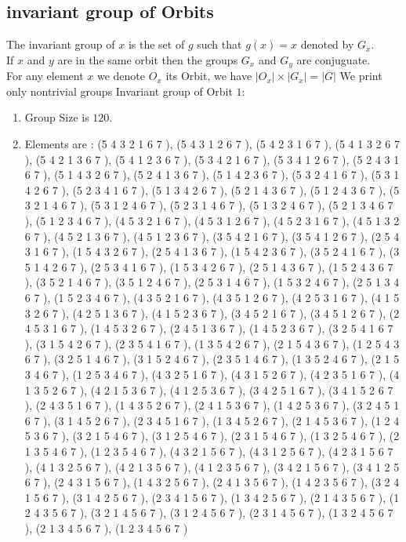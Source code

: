 \documentclass[12pt]{article}
\begin{document}
\subsection{invariant group of Orbits}
\noindent The invariant group of $x$ is the set of $g$ such that $g(x)=x$ denoted by $G_x$.\\
If $x$ and $y$ are in the same orbit then the groups $G_x$ and  $G_y$ are conjuguate.\\
For any element $x$ we denote $O_x$ its Orbit, we have $|O_x|\times |G_x|=|G|$
We print only nontrivial groups
Invariant group of Orbit $1$:
\begin{enumerate}
\item Group Size is $120$.
\item Elements are : (5 4 3 2 1 6 7  ), (5 4 3 1 2 6 7  ), (5 4 2 3 1 6 7  ), (5 4 1 3 2 6 7  ), (5 4 2 1 3 6 7  ), (5 4 1 2 3 6 7  ), (5 3 4 2 1 6 7  ), (5 3 4 1 2 6 7  ), (5 2 4 3 1 6 7  ), (5 1 4 3 2 6 7  ), (5 2 4 1 3 6 7  ), (5 1 4 2 3 6 7  ), (5 3 2 4 1 6 7  ), (5 3 1 4 2 6 7  ), (5 2 3 4 1 6 7  ), (5 1 3 4 2 6 7  ), (5 2 1 4 3 6 7  ), (5 1 2 4 3 6 7  ), (5 3 2 1 4 6 7  ), (5 3 1 2 4 6 7  ), (5 2 3 1 4 6 7  ), (5 1 3 2 4 6 7  ), (5 2 1 3 4 6 7  ), (5 1 2 3 4 6 7  ), (4 5 3 2 1 6 7  ), (4 5 3 1 2 6 7  ), (4 5 2 3 1 6 7  ), (4 5 1 3 2 6 7  ), (4 5 2 1 3 6 7  ), (4 5 1 2 3 6 7  ), (3 5 4 2 1 6 7  ), (3 5 4 1 2 6 7  ), (2 5 4 3 1 6 7  ), (1 5 4 3 2 6 7  ), (2 5 4 1 3 6 7  ), (1 5 4 2 3 6 7  ), (3 5 2 4 1 6 7  ), (3 5 1 4 2 6 7  ), (2 5 3 4 1 6 7  ), (1 5 3 4 2 6 7  ), (2 5 1 4 3 6 7  ), (1 5 2 4 3 6 7  ), (3 5 2 1 4 6 7  ), (3 5 1 2 4 6 7  ), (2 5 3 1 4 6 7  ), (1 5 3 2 4 6 7  ), (2 5 1 3 4 6 7  ), (1 5 2 3 4 6 7  ), (4 3 5 2 1 6 7  ), (4 3 5 1 2 6 7  ), (4 2 5 3 1 6 7  ), (4 1 5 3 2 6 7  ), (4 2 5 1 3 6 7  ), (4 1 5 2 3 6 7  ), (3 4 5 2 1 6 7  ), (3 4 5 1 2 6 7  ), (2 4 5 3 1 6 7  ), (1 4 5 3 2 6 7  ), (2 4 5 1 3 6 7  ), (1 4 5 2 3 6 7  ), (3 2 5 4 1 6 7  ), (3 1 5 4 2 6 7  ), (2 3 5 4 1 6 7  ), (1 3 5 4 2 6 7  ), (2 1 5 4 3 6 7  ), (1 2 5 4 3 6 7  ), (3 2 5 1 4 6 7  ), (3 1 5 2 4 6 7  ), (2 3 5 1 4 6 7  ), (1 3 5 2 4 6 7  ), (2 1 5 3 4 6 7  ), (1 2 5 3 4 6 7  ), (4 3 2 5 1 6 7  ), (4 3 1 5 2 6 7  ), (4 2 3 5 1 6 7  ), (4 1 3 5 2 6 7  ), (4 2 1 5 3 6 7  ), (4 1 2 5 3 6 7  ), (3 4 2 5 1 6 7  ), (3 4 1 5 2 6 7  ), (2 4 3 5 1 6 7  ), (1 4 3 5 2 6 7  ), (2 4 1 5 3 6 7  ), (1 4 2 5 3 6 7  ), (3 2 4 5 1 6 7  ), (3 1 4 5 2 6 7  ), (2 3 4 5 1 6 7  ), (1 3 4 5 2 6 7  ), (2 1 4 5 3 6 7  ), (1 2 4 5 3 6 7  ), (3 2 1 5 4 6 7  ), (3 1 2 5 4 6 7  ), (2 3 1 5 4 6 7  ), (1 3 2 5 4 6 7  ), (2 1 3 5 4 6 7  ), (1 2 3 5 4 6 7  ), (4 3 2 1 5 6 7  ), (4 3 1 2 5 6 7  ), (4 2 3 1 5 6 7  ), (4 1 3 2 5 6 7  ), (4 2 1 3 5 6 7  ), (4 1 2 3 5 6 7  ), (3 4 2 1 5 6 7  ), (3 4 1 2 5 6 7  ), (2 4 3 1 5 6 7  ), (1 4 3 2 5 6 7  ), (2 4 1 3 5 6 7  ), (1 4 2 3 5 6 7  ), (3 2 4 1 5 6 7  ), (3 1 4 2 5 6 7  ), (2 3 4 1 5 6 7  ), (1 3 4 2 5 6 7  ), (2 1 4 3 5 6 7  ), (1 2 4 3 5 6 7  ), (3 2 1 4 5 6 7  ), (3 1 2 4 5 6 7  ), (2 3 1 4 5 6 7  ), (1 3 2 4 5 6 7  ), (2 1 3 4 5 6 7  ), (1 2 3 4 5 6 7  )
\end{enumerate}
\end{document}
